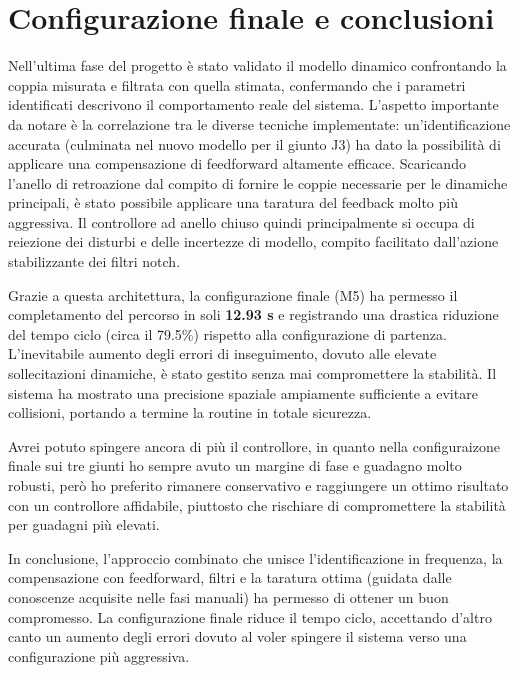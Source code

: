 \documentclass{article}
\begin{document}
\section{Configurazione finale e conclusioni}
Nell'ultima fase del progetto è stato validato il modello dinamico confrontando la coppia misurata e filtrata 
con quella stimata, confermando che i parametri identificati descrivono il comportamento reale del sistema.
L'aspetto importante da notare è la correlazione tra le diverse tecniche implementate: 
 un'identificazione accurata (culminata nel nuovo modello per il giunto J3) ha dato la possibilità 
 di applicare una compensazione di feedforward altamente efficace. Scaricando l'anello di retroazione dal 
 compito di fornire le coppie necessarie per le dinamiche principali, è stato possibile applicare una 
 taratura del feedback molto più aggressiva. Il controllore ad anello chiuso quindi principalmente si occupa 
di reiezione dei disturbi e delle incertezze di modello, compito facilitato dall'azione stabilizzante dei filtri notch.

Grazie a questa architettura, la configurazione finale (M5) ha permesso il completamento del percorso in soli \textbf{12.93 s} 
e registrando una drastica riduzione del tempo ciclo (circa il 79.5\%) rispetto alla configurazione di partenza. 
L'inevitabile aumento degli errori di inseguimento, dovuto alle elevate sollecitazioni dinamiche,
è stato gestito senza mai compromettere la stabilità. Il sistema ha mostrato una precisione spaziale ampiamente 
sufficiente a evitare collisioni, portando a termine la routine in totale sicurezza.

Avrei potuto spingere ancora di più il controllore, in quanto nella configuraizone finale sui tre giunti ho sempre avuto 
un margine di fase e guadagno molto robusti, però ho preferito rimanere conservativo e raggiungere un ottimo risultato
con un controllore affidabile, piuttosto che rischiare di compromettere la stabilità per guadagni più elevati.

In conclusione, l'approccio combinato che unisce l'identificazione in frequenza, la compensazione con feedforward, filtri
e la taratura ottima (guidata dalle conoscenze acquisite nelle fasi manuali) ha permesso di ottener un buon compromesso.
La configurazione finale riduce il tempo ciclo, accettando d'altro canto un aumento degli errori dovuto al voler spingere 
il sistema verso una configurazione più aggressiva.
\end{document}
